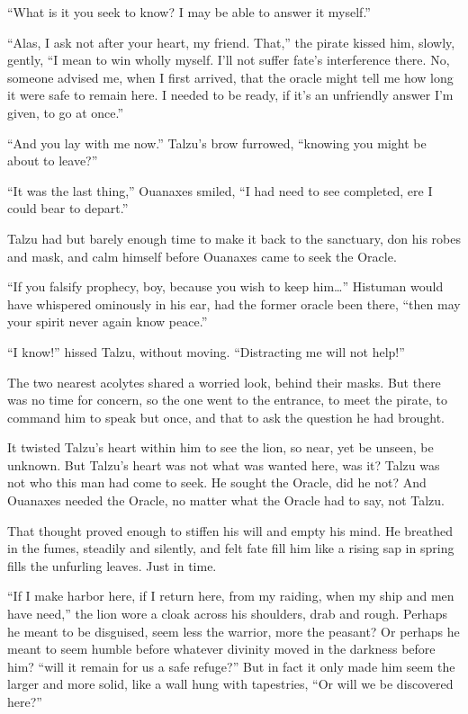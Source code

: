 ``What is it you seek to know? I may be able to answer it myself.''

``Alas, I ask not after your heart, my friend. That,'' the pirate kissed him, slowly, gently, ``I mean to win wholly myself. I'll not suffer fate's interference there. No, someone advised me, when I first arrived, that the oracle might tell me how long it were safe to remain here. I needed to be ready, if it's an unfriendly answer I'm given, to go at once.''

``And you lay with me now.'' Talzu's brow furrowed, ``knowing you might be about to leave?''

``It was the last thing,'' Ouanaxes smiled, ``I had need to see completed, ere I could bear to depart.''

Talzu had but barely enough time to make it back to the sanctuary, don his robes and mask, and calm himself before Ouanaxes came to seek the Oracle.

``If you falsify prophecy, boy, because you wish to keep him\ldots'' Histuman would have whispered ominously in his ear, had the former oracle been there, ``then may your spirit never again know peace.''

``I know!'' hissed Talzu, without moving. ``Distracting me will not help!''

The two nearest acolytes shared a worried look, behind their masks. But there was no time for concern, so the one went to the entrance, to meet the pirate, to command him to speak but once, and that to ask the question he had brought.

It twisted Talzu's heart within him to see the lion, so near, yet be unseen, be unknown. But Talzu's heart was not what was wanted here, was it? Talzu was not who this man had come to seek. He sought the Oracle, did he not? And Ouanaxes needed the Oracle, no matter what the Oracle had to say, not Talzu.

That thought proved enough to stiffen his will and empty his mind. He breathed in the fumes, steadily and silently, and felt fate fill him like a rising sap in spring fills the unfurling leaves. Just in time.

``If I make harbor here, if I return here, from my raiding, when my ship and men have need,'' the lion wore a cloak across his shoulders, drab and rough. Perhaps he meant to be disguised, seem less the warrior, more the peasant? Or perhaps he meant to seem humble before whatever divinity moved in the darkness before him? ``will it remain for us a safe refuge?'' But in fact it only made him seem the larger and more solid, like a wall hung with tapestries, ``Or will we be discovered here?''

